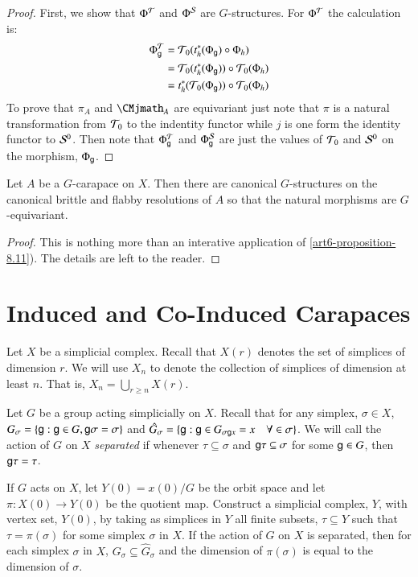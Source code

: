 \begin{proof}
First, we show that $\Phi^{\mathcal{T}}$ and $\Phi^{\mathcal{S}}$ are $G$-structures. For $\Phi^{\mathcal{T}}$ the calculation is:
\begin{align*}
\Phi_{\mathsf{g}}^{\mathcal{T}} &= \mathcal{T}_{0}(t_{h}^{*}(\Phi_{\mathsf{g}}) \circ \Phi_{h})\\
&= \mathcal{T}_{0}(t_{h}^{*}(\Phi_{\mathsf{g}})) \circ \mathcal{T}_{0}(\Phi_{h})\\
& = t_{h}^{*}(\mathcal{T}_{0}(\Phi_{\mathsf{g}})) \circ \mathcal{T}_{0}(\Phi_{h})
\end{align*}
To prove that $\pi_{A}$ and $\CMjmath_{A}$ are equivariant just note that $\pi$ is a natural transformation from $\mathcal{T}_{0}$ to the indentity functor while $j$ is one form the identity functor to $\mathcal{S}^{0}$. Then note that $\Phi_{\mathsf{g}}^{\mathcal{T}}$ and $\Phi_{\mathsf{g}}^{\mathcal{S}}$ are just the values of $\mathcal{T}_{0}$ and $\mathcal{S}^{0}$ on the morphism, $\Phi_{\mathsf{g}}$.
\end{proof}

\begin{coro}\label{art6-corollary-8.12}
Let $A$ be a $G$-carapace on $X$. Then there are canonical $G$-structures on the canonical brittle and flabby resolutions of $A$ so that the natural morphisms are $G$-equivariant.
\end{coro}

\begin{proof}
This is nothing more than an interative application of \ref{art6-proposition-8.11}). The details are left to the reader.
\end{proof}

\section{Induced and Co-Induced Carapaces}\label{art6-sec-9}
Let $X$ be a simplicial complex. Recall that $X(r)$ denotes the set of simplices of dimension $r$. We will use $X_{n}$ to denote the collection of simplices of dimension at least $n$. That is, $X_{n} = \bigcup_{r \geq n}X(r)$.

Let $G$ be a group acting simplicially on $X$. Recall that for any simplex, $\sigma \in X$, $G_{\sigma} = \{\mathsf{g} : \mathsf{g} \in G, \mathsf{g} \sigma = \sigma\}$ and $\hat{G}_{\sigma}= \{ \mathsf{g} : \mathsf{g} \in G_{\sigma \mathsf{g} x} = x \quad \forall \in \sigma \}$. We will call the action of $G$ on $X$ \textit{separated} if whenever $\tau \subseteq \sigma$ and $\mathsf{g}\tau \subseteq \sigma$ for some $\mathsf{g} \in G$, then $\mathsf{g}\tau = \tau$.

If $G$ acts on $X$, let $Y(0)= x(0)/G$ be the orbit space and let $\pi : X(0)\rightarrow Y(0)$ be the quotient map. Construct a simplicial complex, $Y$, with vertex set, $Y(0)$, by taking as simplices in $Y$ all finite subsets, $\tau \subseteq Y$ such that $\tau = \pi(\sigma)$ for some simplex $\sigma$ in $X$. If the action of $G$ on $X$ is separated, then for each simplex $\sigma$ in $X$, $G_{\sigma} \subseteq \hat{G}_{\sigma}$ and the dimension of $\pi(\sigma)$ is equal to the dimension of $\sigma$.

